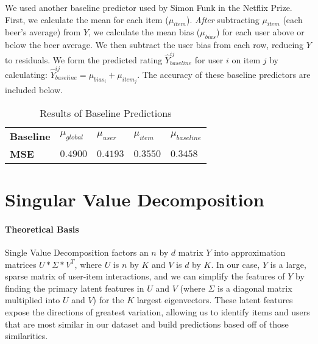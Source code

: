 \documentclass[12pt]{article}
\begin{document}
We used another baseline predictor used by Simon Funk in the Netflix Prize.\textsuperscript{\cite{Funk}} First, we calculate the mean for each item ($\mu_{item}$). \textit{After} subtracting $\mu_{item}$ (each beer's average) from $Y$, we calculate the mean bias ($\mu_{bias}$) for each user above or below the beer average. We then subtract the user bias from each row, reducing $Y$ to residuals. We form the predicted rating $\hat{Y}^{ij}_{baseline}$ for user $i$ on item $j$ by calculating: $\hat{Y}^{ij}_{baseline} = \mu_{bias_i} + \mu_{item_j}$. The accuracy of these baseline predictors are included below.

\begin{table}[ht!]
\centering
\caption{Results of Baseline Predictions}
\vspace{2mm}
\begin{tabular}{lllll}
\hline
\textbf{Baseline}         & $\mu_{global}$ & $\mu_{user}$ & $\mu_{item}$ & $\mu_{baseline}$ \\
\textbf{MSE}              & $0.4900$       & $0.4193$     & $0.3550$     & $0.3458$         \\ \hline
\end{tabular}
\end{table}

\section{Singular Value Decomposition}
\paragraph{Theoretical Basis} Single Value Decomposition factors an $n$ by $d$ matrix $Y$ into approximation matrices $U * \Sigma * V^{T}$, where $U$ is $n$ by $K$ and $V$ is $d$ by $K$. In our case, $Y$ is a large, sparse matrix of user-item interactions, and we can simplify the features of $Y$ by finding the primary latent features in $U$ and $V$ (where $\Sigma$ is a diagonal matrix multiplied into $U$ and $V$) for the $K$ largest eigenvectors. These latent features expose the directions of greatest variation, allowing us to identify items and users that are most similar in our dataset and build predictions based off of those similarities.
\end{document}
